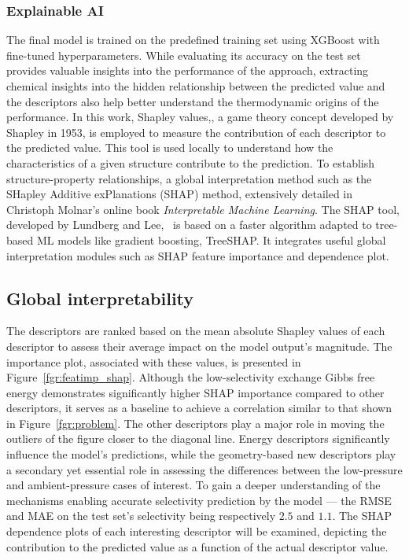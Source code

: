 \documentclass[main]{subfiles}
\begin{document}
\subsubsection{Explainable AI}

The final model is trained on the predefined training set using XGBoost with fine-tuned hyperparameters. While evaluating its accuracy on the test set provides valuable insights into the performance of the approach, extracting chemical insights into the hidden relationship between the predicted value and the descriptors also help better understand the thermodynamic origins of the performance. In this work, Shapley values,\autocite{shapley1953value}, a game theory concept developed by Shapley in 1953, is employed to measure the contribution of each descriptor to the predicted value. This tool is used locally to understand how the characteristics of a given structure contribute to the prediction. To establish structure-property relationships, a global interpretation method such as the SHapley Additive exPlanations (SHAP) method, extensively detailed in Christoph Molnar's online book \emph{Interpretable Machine Learning}.\autocite{molnar2020interpretable} The SHAP tool, developed by Lundberg and Lee,~\autocite{SHAP} is based on a faster algorithm adapted to tree-based ML models like gradient boosting, TreeSHAP. It integrates useful global interpretation modules such as SHAP feature importance and dependence plot.

\subsection{Global interpretability}

The descriptors are ranked based on the mean absolute Shapley values of each descriptor to assess their average impact on the model output's magnitude. The importance plot, associated with these values, is presented in Figure~\ref{fgr:featimp_shap}. Although the low-selectivity exchange Gibbs free energy demonstrates significantly higher SHAP importance compared to other descriptors, it serves as a baseline to achieve a correlation similar to that shown in Figure~\ref{fgr:problem}. The other descriptors play a major role in moving the outliers of the figure closer to the diagonal line. Energy descriptors significantly influence the model's predictions, while the geometry-based new descriptors play a secondary yet essential role in assessing the differences between the low-pressure and ambient-pressure cases of interest. To gain a deeper understanding of the mechanisms enabling accurate selectivity prediction by the model --- the RMSE and MAE on the test set's selectivity being respectively $2.5$ and $1.1$. The SHAP dependence plots of each interesting descriptor will be examined, depicting the contribution to the predicted value as a function of the actual descriptor value.
\end{document}
